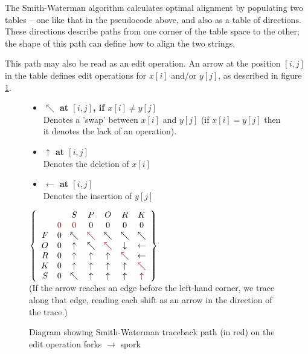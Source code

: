 The Smith-Waterman algorithm calculates optimal alignment by
populating two tables -- one like that in the pseudocode above, and
also as a table of directions.\cite{smithwaterman} These directions describe paths from
one corner of the table space to the other; the shape of this path
can define how to align the two strings.\cite{Smith1981}

This path may also be read as an edit operation. An arrow at the
position $[i,j]$ in the table defines edit operations for $x[i]$
and/or $y[j]$, as described in figure
\ref{fig:smith-waterman-traceback}.

\begin{figure}[h]
  \centering 
  \begin{itemize}
  \item \textbf{$\nwarrow$ at $[i,j]$, if $x[i] \neq y[j]$} \\ Denotes a
    'swap' between $x[i]$ and $y[j]$ (if $x[i] = y[j]$ then it denotes
    the lack of an operation).
  \item \textbf{$\uparrow$ at $[i,j]$}\\Denotes the deletion of $x[i]$
  \item \textbf{$\leftarrow$ at $[i,j]$}\\Denotes the insertion of
    $y[j]$
  \end{itemize}
  \vspace{10mm}

  $\left\{
  \begin{array}{ccccccc}
    & & S & P & O & R & K \\ & \color{red}{0} & \color{red}{0} & 0 & 0
    & 0 & 0 \\ F & 0 & \nwarrow & \color{red}{\nwarrow} & \nwarrow &
    \nwarrow & \nwarrow \\ O & 0 & \uparrow & \nwarrow &
    \color{red}{\nwarrow} & \downarrow & \leftarrow \\ R & 0 &
    \uparrow & \uparrow & \uparrow & \color{red}{\nwarrow} &
    \leftarrow \\ K & 0 & \uparrow & \uparrow & \uparrow & \uparrow &
    \color{red}{\nwarrow} \\ S & 0 & \nwarrow & \uparrow & \uparrow &
    \uparrow & \color{red}{\uparrow} \\
  \end{array}\right\} $\\
  (If the arrow reaches an edge before the left-hand corner, we trace
  along that edge, reading each shift as an arrow in the direction of
  the trace.)
  \caption{Diagram showing Smith-Waterman traceback path (in red) on
    the edit operation forks $\rightarrow$ spork}
  \label{fig:smith-waterman-traceback}
\end{figure}

